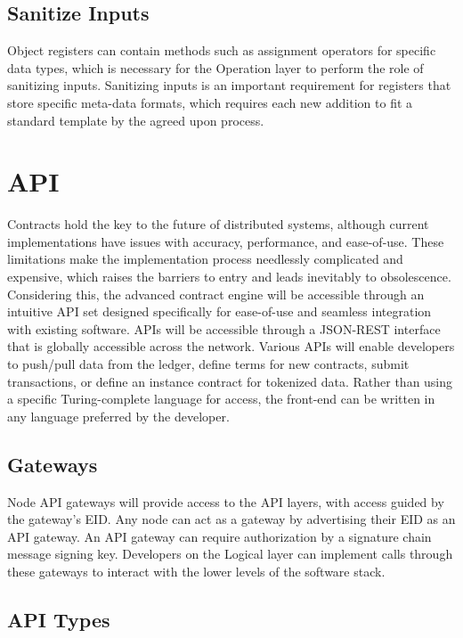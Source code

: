 \documentclass[11pt]{article}
\begin{document}
\subsection{Sanitize Inputs}

Object registers can contain methods such as assignment operators for specific data types, which is necessary for the Operation layer to perform the role of sanitizing inputs.
Sanitizing inputs is an important requirement for registers that store specific meta-data formats, which requires each new addition to fit a standard template by the agreed upon process.


\section{API}

Contracts hold the key to the future of distributed systems, although current implementations have issues with accuracy, performance, and ease-of-use. 
These limitations make the implementation process needlessly complicated and expensive, which raises the barriers to entry and leads inevitably to obsolescence.
Considering this, the advanced contract engine will be accessible through an intuitive API set designed specifically for ease-of-use and seamless integration with existing software.
APIs will be accessible through a JSON-REST interface that is globally accessible across the network.
Various APIs will enable developers to push/pull data from the ledger, define terms for new contracts, submit transactions, or define an instance contract for tokenized data.
Rather than using a specific Turing-complete language for access, the front-end can be written in any language preferred by the developer.

\subsection{Gateways}

Node API gateways will provide access to the API layers, with access guided by the gateway's EID. Any node can act as a gateway by advertising their EID as an API gateway.
An API gateway can require authorization by a signature chain message signing key.
Developers on the Logical layer can implement calls through these gateways to interact with the lower levels of the software stack.

\subsection{API Types}
\end{document}
